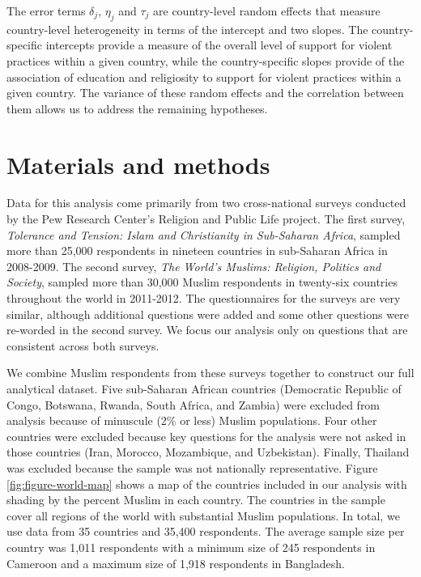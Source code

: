 \documentclass[10pt,letterpaper]{article}
\begin{document}
The error terms \(\delta_j\), \(\eta_j\) and \(\tau_j\) are country-level random effects that measure country-level heterogeneity in terms of the intercept and two slopes. The country-specific intercepts provide a measure of the overall level of support for violent practices within a given country, while the country-specific slopes provide of the association of education and religiosity to support for violent practices within a given country. The variance of these random effects and the correlation between them allows us to address the remaining hypotheses.

\section*{Materials and methods}

Data for this analysis come primarily from two cross-national surveys conducted by the Pew Research Center's Religion and Public Life project. The first survey, \emph{Tolerance and Tension: Islam and Christianity in Sub-Saharan Africa}, sampled more than 25,000 respondents in nineteen countries in sub-Saharan Africa in 2008-2009. The second survey, \emph{The World's Muslims: Religion, Politics and Society}, sampled more than 30,000 Muslim respondents in twenty-six countries throughout the world in 2011-2012. The questionnaires for the surveys are very similar, although additional questions were added and some other questions were re-worded in the second survey. We focus our analysis only on questions that are consistent across both surveys.

We combine Muslim respondents from these surveys together to construct our full analytical dataset. Five sub-Saharan African countries (Democratic Republic of Congo, Botswana, Rwanda, South Africa, and Zambia) were excluded from analysis because of minuscule (2\% or less) Muslim populations. Four other countries were excluded because key questions for the analysis were not asked in those countries (Iran, Morocco, Mozambique, and Uzbekistan). Finally, Thailand was excluded because the sample was not nationally representative. Figure \ref{fig:figure-world-map} shows a map of the countries included in our analysis with shading by the percent Muslim in each country. The countries in the sample cover all regions of the world with substantial Muslim populations. In total, we use data from 35 countries and 35,400 respondents. The average sample size per country was 1,011 respondents with a minimum size of 245 respondents in Cameroon and a maximum size of 1,918 respondents in Bangladesh.
\end{document}
